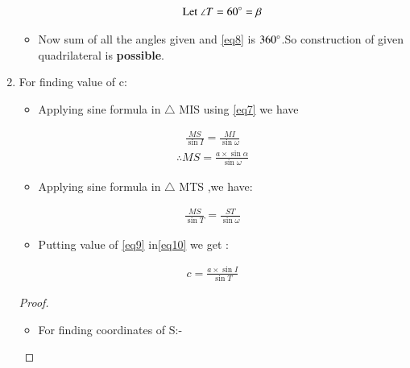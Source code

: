 \documentclass[journal,12pt,twocolumn]{IEEEtran}
\begin{document}
\begin{enumerate}
\begin{itemize}
\begin{align}
\text{Let }\angle T = 60\degree =\beta \label{eq8}
\end{align}
\item Now sum of all the angles given and \eqref{eq8} is $360\degree$.So construction of given quadrilateral is \textbf{possible}.
\end{itemize}
\item For finding value of c:
\begin{itemize}
\item Applying sine formula in $\triangle$ MIS using \eqref{eq7} we have
\end{itemize}
\begin{align}
\frac{MS}{\sin I}=\frac{MI}{\sin \omega }
\end{align}
\begin{align}
\therefore MS=\frac{a\times \sin \alpha}{\sin \omega} \label{eq9}
\end{align}
\begin{itemize}
\item Applying sine formula in $\triangle$ MTS ,we have:
\end{itemize}
\begin{align}
  \frac{MS}{\sin T}=\frac{ST}{\sin \omega} \label{eq10}  
\end{align}
\begin{itemize}
\item Putting value of \eqref{eq9} in\eqref{eq10}
we get :
\end{itemize}
\begin{align}
c=\frac{a\times \sin I}{\sin T} \label{eq11}
\end{align}
\begin{proof}
\begin{itemize}
\item For finding coordinates of S:-

\end{itemize}
\end{proof}
\end{enumerate}
\end{document}
